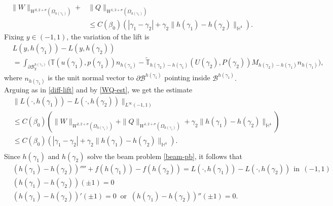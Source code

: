 \documentclass[11pt,a4paper]{amsart}
\theoremstyle{remark}
\theoremstyle{definition}
\numberwithin{equation}{section}
\numberwithin{proposition}{section}
\begin{document}
\begin{equation}\label{WQ-est}\begin{aligned}
    \|W\|_{W^{2, 2+\sigma}(\Omega_{h(\gamma_1)})} +& \|Q\|_{W^{1, 2+\sigma}(\Omega_{h(\gamma_1)})}\\[5pt]&\leq C(\beta_0)\left( |\gamma_1-\gamma_2| + \gamma_2\|h(\gamma_1)- h(\gamma_2)\|_{\mathbb{H}^4}\right).
    \end{aligned}
\end{equation}
Fixing $y\in(-1,1)$, the variation of the lift is
\begin{equation*}\begin{aligned}
   & L(y, h(\gamma_1))- L(y, h(\gamma_2)) \\[5pt]&= \int_{\partial \mathcal{B}_y^{h(\gamma_1)}}\bigg( \mathbb{T}(u(\gamma_1), p(\gamma_1)) n_{h(\gamma_1)}  - \widetilde{\mathbb{T}}_{h(\gamma_2)-h(\gamma_1)}(U(\gamma_2), P(\gamma_2)) M_{h(\gamma_2)-h(\gamma_1)} n_{h(\gamma_1)}\bigg),
    \end{aligned}
\end{equation*} where $n_{h(\gamma_1)}$ is the unit normal vector to $\partial \mathcal{B}^{h(\gamma_1)}$ pointing inside $\mathcal{B}^{h(\gamma_1)}.$
Arguing as in \eqref{diff-lift} and by \eqref{WQ-est},
we get the estimate
\begin{equation}\label{diff-lift-gamma}\begin{aligned}
  & \| L(\cdot, h(\gamma_1))- L(\cdot, h(\gamma_2))\|_{L^\infty(-1,1)}\\[5pt]&\leq C(\beta_0)\left( \|W\|_{W^{2, 2+\sigma}(\Omega_{h(\gamma_1)})} + \|Q\|_{W^{1, 2+\sigma}(\Omega_{h(\gamma_1)})} + \gamma_2 \|h(\gamma_1)- h(\gamma_2)\|_{\mathbb{H}^4}    \right) \\[5pt]&\leq C(\beta_0)\left( |\gamma_1-\gamma_2|+ \gamma_2 \|h(\gamma_1)- h(\gamma_2)\|_{\mathbb{H}^4}    \right) .\\[5pt]
  \end{aligned}
\end{equation}
Since $h(\gamma_1)$ and $h(\gamma_2)$ solve the beam problem \eqref{beam-pb}, it follows that
\begin{equation}\label{beam-pb-diff}
		\begin{aligned}
			&(h(\gamma_1)- h(\gamma_2))''''+ f(h(\gamma_1)) -f(h(\gamma_2)) = L(\cdot, h(\gamma_1)) - L(\cdot, h(\gamma_2))   \ \ \text{in} \ \ (-1,1) \\[5pt]
			&(h(\gamma_1)- h(\gamma_2))(\pm 1) = 0 \\[5pt]  &(h(\gamma_1)- h(\gamma_2))'(\pm 1)=0 \ \text{ or } \ (h(\gamma_1)- h(\gamma_2))''(\pm 1)=0.\\[5pt]
		\end{aligned}
	\end{equation}
\end{document}
